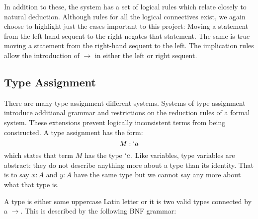   In addition to these, the system has a set of logical rules which relate closely to natural deduction.
  Although rules for all the logical connectives exist, we again choose to highlight just the cases important to this project:
  Moving a statement from the left-hand sequent to the right negates that statement.
  The same is true moving a statement from the right-hand sequent to the left.
  The implication rules allow the introduction of $\to$ in either the left or right sequent.
  
  \subsection{Type Assignment}\label{sec:type-assignment}
  
  There are many type assignment different systems.
  Systems of type assignment introduce additional grammar and restrictions on the reduction rules of a formal system. 
  These extensions prevent logically inconsistent terms from being constructed. 
  A type assignment has the form:
  \[
    M : `a 
  \]
  which states that term $M$ has the type $`a$. 
  Like variables, type variables are abstract: 
  they do not describe anything more about a type than its identity. 
  That is to say $x: A$ and $y : A$ have the same type but we cannot say any more about what that type is.
 
  A type is either some uppercase Latin letter or it is two valid types connected by a $\rightarrow$. 
  This is described by the following BNF grammar:
 \\ 
  

